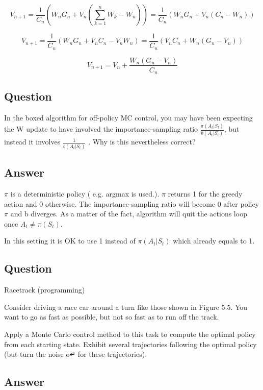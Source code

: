 \documentclass[11pt]{article}
\begin{document}
    \begin{equation}
        V_{n+1} = \frac{ 1 }{ C_{n} } ( W_{n} G_{n} + V_{n} (\sum_{k=1}^{n} W_{k} - W_{n}) ) = \frac{ 1 }{ C_{n} } ( W_{n} G_{n} + V_{n} (C_{n} - W_{n}) )
    \end{equation}

    \begin{equation}
        V_{n+1} = \frac{ 1 }{ C_{n} } ( W_{n} G_{n} + V_{n} C_{n} - V_{n}  W_{n} ) = \frac{ 1 }{ C_{n} } ( V_{n} C_{n} + W_{n} ( G_{n} - V_{n} ) )
    \end{equation}

    \begin{equation}
        V_{n+1} = V_{n} +  \frac{ W_{n} ( G_{n} - V_{n} ) }{ C_{n}}
    \end{equation}

    \subsection{Question}

    In the boxed algorithm for off-policy MC control, you may have been expecting the W update to have involved the importance-sampling ratio $ \frac{\pi(A_t|S_t)}{b(A_t|S_t)} $, but instead it involves $ \frac{ 1 }{b(A_t|S_t)} $ .
    Why is this nevertheless correct?

    \subsection*{Answer}

    $\pi$ is a deterministic policy ( e.g. argmax is used.).
    $ \pi $ returns 1 for the greedy action and 0 otherwise.
    The importance-sampling ratio will become 0 after policy $\pi$ and b diverges.
    As a matter of the fact, algorithm will quit the actions loop once $ A_t \neq \pi(S_t)$.

    In this setting it is OK to use 1 instead of $\pi(A_t|S_t)$ which already equals to 1.

    \subsection{Question}

    Racetrack (programming)

    Consider driving a race car around a turn like those shown in Figure 5.5. You want to go as fast as possible, but not so fast as to run off the track.

    Apply a Monte Carlo control method to this task to compute the optimal policy from each starting state.
    Exhibit several trajectories following the optimal policy (but turn the noise o↵ for these trajectories).

    \subsection*{Answer}
\end{document}
